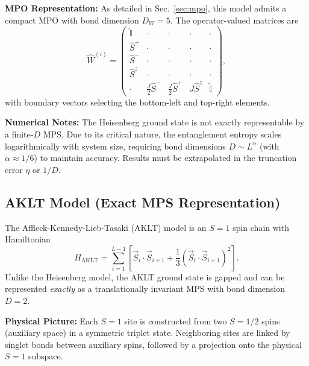 \documentclass[aps,prb,onecolumn,scriptaddress]{revtex4-2}
\newcommand{\Id}{\mathbb{I}}
\begin{document}
	\textbf{MPO Representation:} As detailed in Sec.~\ref{sec:mpo}, this model admits a compact MPO with bond dimension $D_W=5$. The operator-valued matrices are
	\begin{equation}
		\hat{W}^{(i)} = \begin{pmatrix}
			\hat{\Id} & \cdot & \cdot & \cdot & \cdot \\
			\hat{S}^+ & \cdot & \cdot & \cdot & \cdot \\
			\hat{S}^- & \cdot & \cdot & \cdot & \cdot \\
			\hat{S}^z & \cdot & \cdot & \cdot & \cdot \\
			\cdot & \frac{J}{2}\hat{S}^- & \frac{J}{2}\hat{S}^+ & J\hat{S}^z & \hat{\Id}
		\end{pmatrix},
	\end{equation}
	with boundary vectors selecting the bottom-left and top-right elements.
	
	\textbf{Numerical Notes:} The Heisenberg ground state is not exactly representable by a finite-$D$ MPS. Due to its critical nature, the entanglement entropy scales logarithmically with system size, requiring bond dimensions $D \sim L^{\alpha}$ (with $\alpha \approx 1/6$) to maintain accuracy. Results must be extrapolated in the truncation error $\eta$ or $1/D$.
	
	\subsection{AKLT Model (Exact MPS Representation)}
	The Affleck-Kennedy-Lieb-Tasaki (AKLT) model is an $S=1$ spin chain with Hamiltonian
	\begin{equation}
		H_{\text{AKLT}} = \sum_{i=1}^{L-1} \left[ \vec{S}_i \cdot \vec{S}_{i+1} + \frac{1}{3} (\vec{S}_i \cdot \vec{S}_{i+1})^2 \right].
	\end{equation}
	Unlike the Heisenberg model, the AKLT ground state is gapped and can be represented \textit{exactly} as a translationally invariant MPS with bond dimension $D=2$.
	
	\textbf{Physical Picture:} Each $S=1$ site is constructed from two $S=1/2$ spins (auxiliary space) in a symmetric triplet state. Neighboring sites are linked by singlet bonds between auxiliary spins, followed by a projection onto the physical $S=1$ subspace.
	
\end{document}
